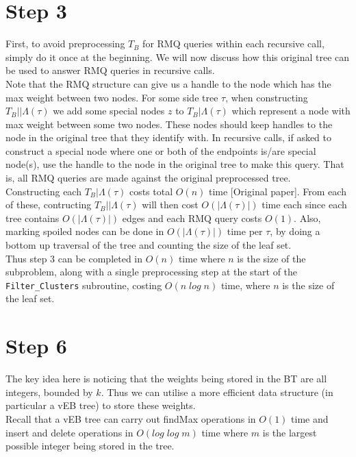 \documentclass[a4paper]{article}
\begin{document}
    \section{Step 3}

    First, to avoid preprocessing $T_B$ for RMQ queries within each recursive call, simply do it once at the beginning. We will now discuss how this original tree can be used to answer RMQ queries in recursive calls.\\

    Note that the RMQ structure can give us a handle to the node which has the max weight between two nodes. For some side tree $\tau$, when constructing $T_B||\Lambda(\tau)$ we add some special nodes $z$ to $T_B|\Lambda(\tau)$ which represent a node with max weight between some two nodes. These nodes should keep handles to the node in the original tree that they identify with. In recursive calls, if asked to construct a special node where one or both of the endpoints is/are special node(s), use the handle to the node in the original tree to make this query. That is, all RMQ queries are made against the original preprocessed tree.\\

    Constructing each $T_B|\Lambda(\tau)$ costs total $O(n)$ time [Original paper]. From each of these, contructing $T_B||\Lambda(\tau)$ will then cost $O(|\Lambda(\tau)|)$ time each since each tree contains $O(|\Lambda(\tau)|)$ edges and each RMQ query costs $O(1)$. Also, marking spoiled nodes can be done in $O(|\Lambda(\tau)|)$ time per $\tau$, by doing a bottom up traversal of the tree and counting the size of the leaf set.\\

    Thus step 3 can be completed in $O(n)$ time where $n$ is the size of the subproblem, along with a single preprocessing step at the start of the \texttt{Filter\_Clusters} subroutine, costing $O(n\;log\;n)$ time, where $n$ is the size of the leaf set.

    \section{Step 6}

    The key idea here is noticing that the weights being stored in the BT are all integers, bounded by $k$. Thus we can utilise a more efficient data structure (in particular a vEB tree) to store these weights.\\

    Recall that a vEB tree can carry out findMax operations in $O(1)$ time and insert and delete operations in $O(log\;log\;m)$ time where $m$ is the largest possible integer being stored in the tree.\\
\end{document}
